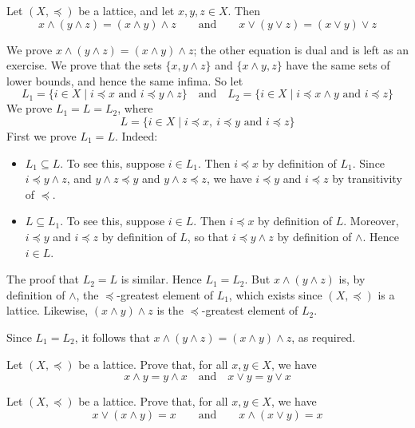 \begin{proposition}
\label{propInfDistributesOverSup}
Let $(X, \preceq)$ be a lattice, and let $x,y,z \in X$. Then
\[ x \wedge (y \wedge z) = (x \wedge y) \wedge z \qquad \text{and} \qquad x \vee (y \vee z) = (x \vee y) \vee z \]
\end{proposition}
\begin{cproof}
We prove $x \wedge (y \wedge z) = (x \wedge y) \wedge z$; the other equation is dual and is left as an exercise. We prove that the sets $\{ x, y \wedge z \}$ and $\{ x \wedge y, z \}$ have the same sets of lower bounds, and hence the same infima. So let
\[ L_1 = \{ i \in X \mid i \preceq x \text{ and } i \preceq y \wedge z \} \quad \text{and} \quad L_2 = \{ i \in X \mid i \preceq x \wedge y \text{ and } i \preceq z \} \]
We prove $L_1 = L = L_2$, where
\[ L = \{ i \in X \mid i \preceq x,\ i \preceq y \text{ and } i \preceq z \} \]
First we prove $L_1 = L$. Indeed:
\begin{itemize}
\item $L_1 \subseteq L$. To see this, suppose $i \in L_1$. Then $i \preceq x$ by definition of $L_1$. Since $i \preceq y \wedge z$, and $y \wedge z \preceq y$ and $y \wedge z \preceq z$, we have $i \preceq y$ and $i \preceq z$ by transitivity of $\preceq$.
\item $L \subseteq L_1$. To see this, suppose $i \in L$. Then $i \preceq x$ by definition of $L$. Moreover, $i \preceq y$ and $i \preceq z$ by definition of $L$, so that $i \preceq y \wedge z$ by definition of $\wedge$. Hence $i \in L$.
\end{itemize}
The proof that $L_2 = L$ is similar. Hence $L_1=L_2$. But $x \wedge (y \wedge z)$ is, by definition of $\wedge$, the $\preceq$-greatest element of $L_1$, which exists since $(X, \preceq)$ is a lattice. Likewise, $(x \wedge y) \wedge z$ is the $\preceq$-greatest element of $L_2$.

Since $L_1=L_2$, it follows that $x \wedge (y \wedge z) = (x \wedge y) \wedge z$, as required.
\end{cproof}

\begin{exercise}
Let $(X, \preceq)$ be a lattice. Prove that, for all $x,y \in X$, we have
\[ x \wedge y = y \wedge x \quad \text{and} \quad x \vee y = y \vee x \]
\end{exercise}

\begin{exercise}
Let $(X, \preceq)$ be a lattice. Prove that, for all $x,y \in X$, we have
\[ x \vee (x \wedge y) = x \qquad \text{and} \qquad x \wedge (x \vee y) = x \]
\end{exercise}

